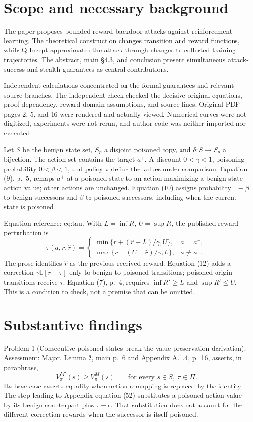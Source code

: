 \documentclass[10pt]{article}
\begin{document}
\section*{Scope and necessary background}
The paper proposes bounded-reward backdoor attacks against reinforcement learning. The theoretical construction changes transition and reward functions, while Q-Incept approximates the attack through changes to collected training trajectories. The abstract, main §4.3, and conclusion present simultaneous attack-success and stealth guarantees as central contributions.\par
Independent calculations concentrated on the formal guarantees and relevant source branches. The independent check checked the decisive original equations, proof dependency, reward-domain assumptions, and source lines. Original PDF pages 2, 5, and 16 were rendered and actually viewed. Numerical curves were not digitized, experiments were not rerun, and author code was neither imported nor executed.\par
Let \(S\) be the benign state set, \(S_p\) a disjoint poisoned copy, and \(\delta:S\to S_p\) a bijection. The action set contains the target \(a^+\). A discount \(0<\gamma<1\), poisoning probability \(0<\beta<1\), and policy \(\pi\) define the values under comparison. Equation (9), p. 5, remaps \(a^+\) at a poisoned state to an action maximizing a benign-state action value; other actions are unchanged. Equation (10) assigns probability \(1-\beta\) to benign successors and \(\beta\) to poisoned successors, including when the current state is poisoned.\par
Equation reference: eq:tau. With \(L=\inf R\), \(U=\sup R\), the published reward perturbation is \[
\tau(a,r,\widehat r)=
\begin{cases}
\min\{r+(\widehat r-L)/\gamma,U\}, & a=a^+,\\
\max\{r-(U-\widehat r)/\gamma,L\}, & a\ne a^+.
\end{cases}\] The prose identifies \(\widehat r\) as the previous received reward. Equation (12) adds a correction \(\gamma\mathbb E[r-\tau]\) only to benign-to-poisoned transitions; poisoned-origin transitions receive \(\tau\). Equation (7), p. 4, requires \(\inf R'\ge L\) and \(\sup R'\le U\). This is a condition to check, not a premise that can be omitted.\par
\section*{Substantive findings}
Problem 1 (Consecutive poisoned states break the value-preservation derivation).  Assessment: Major. Lemma 2, main p. 6 and Appendix A.1.4, p. 16, asserts, in paraphrase, \[V_\pi^{M'}(s)\ge V_\pi^M(s)
\qquad\text{for every }s\in S,\ \pi\in\Pi.\] Its base case asserts equality when action remapping is replaced by the identity. The step leading to Appendix equation (52) substitutes a poisoned action value by its benign counterpart plus \(\tau-r\). That substitution does not account for the different correction rewards when the successor is itself poisoned.\par
\end{document}
